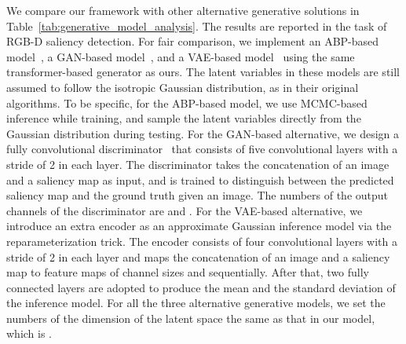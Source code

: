 \documentclass{article}
\begin{document}
We compare our framework with other alternative generative solutions in Table~\ref{tab:generative_model_analysis}. The results are reported in the task of RGB-D saliency detection. For fair comparison, we implement an ABP-based model~\cite{abp}, a GAN-based model~\cite{GAN_nips}, and a VAE-based model~\cite{vae_bayes_kumar,structure_output} using the same transformer-based generator as ours. The latent variables in these models are still assumed to follow the isotropic Gaussian distribution, as in their original algorithms. 
To be specific, for the ABP-based model, we use MCMC-based inference while training, and sample the latent variables directly from the Gaussian distribution during testing.
For the GAN-based alternative, we design a fully convolutional discriminator~\cite{hung2018adversarial} that consists of five  convolutional layers with a stride of 2 in each layer. The discriminator takes the concatenation of an image and a saliency map as input, and is trained to distinguish between the predicted saliency map and the ground truth given an image. The numbers of the output channels of the discriminator are  and . For the VAE-based alternative, we introduce an extra encoder as an approximate Gaussian inference model via the reparameterization trick. The encoder consists of four  convolutional layers with a stride of 2 in each layer and maps the concatenation of an image and a saliency map to feature maps of channel sizes  and  sequentially. After that, two fully connected layers are adopted to produce the mean and the standard deviation of the inference model.
For all the three alternative generative models, we set the numbers of the dimension of the latent space the same as that in our model, which is . 
\end{document}
